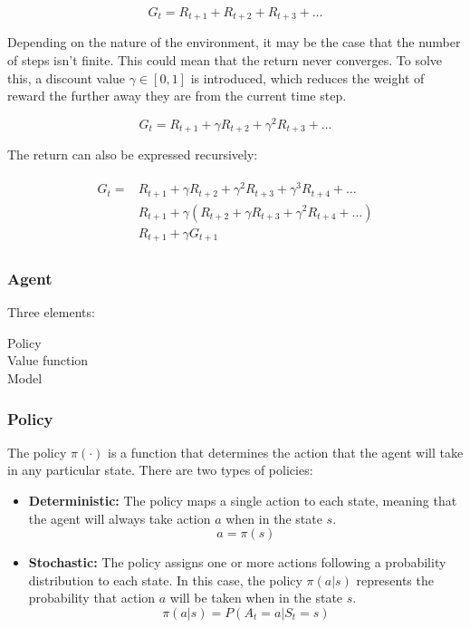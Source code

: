 \begin{equation}
    G_t = R_{t+1} + R_{t+2} + R_{t+3} + \ldots
\end{equation}

Depending on the nature of the environment, it may be the case that the number of steps isn't finite. This could mean that the return never converges. To solve this, a discount value $\gamma \in [0,1]$ is introduced, which reduces the weight of reward the further away they are from the current time step.

\begin{equation}
    G_t = R_{t+1} + \gamma R_{t+2} + \gamma^2 R_{t+3} + \ldots
\end{equation}

The return can also be expressed recursively:

\begin{align}
\begin{split}
    G_t = &R_{t+1} + \gamma R_{t+2} + \gamma^2 R_{t+3}  + \gamma^3 R_{t+4} + \ldots\\
    &R_{t+1} + \gamma(R_{t+2} + \gamma R_{t+3} + \gamma^2 R_{t+4} + \ldots)\\
    &R_{t+1} + \gamma G_{t+1}
\end{split}
\end{align}

\subsubsection{Agent}

Three elements:

\begin{description}
    \item[Policy]
    \item[Value function]
    \item[Model]
\end{description}

\subsubsection*{Policy}

The policy $\pi(\cdot)$ is a function that determines the action that the agent will take in any particular state. There are two types of policies:

\begin{itemize}
    \item \textbf{Deterministic:} The policy maps a single action to each state, meaning that the agent will always take action $a$ when in the state $s$.
    \begin{equation}
        a = \pi(s)
    \end{equation}
    \item \textbf{Stochastic:} The policy assigns one or more actions following a probability distribution to each state. In this case, the policy $\pi(a|s)$ represents the probability that action $a$ will be taken when in the state $s$.
    \begin{equation}
        \pi(a|s) = P(A_t=a|S_t=s)
    \end{equation}
\end{itemize}

